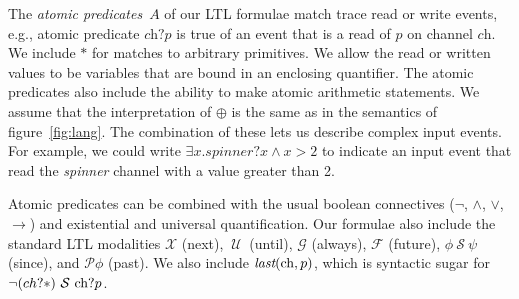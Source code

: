 \documentclass[10pt,conference,compsocconf]{IEEEtran}
\newcommand{\code}[1]{\text{\lstinline!#1!}}
\newcommand{\sch}{\textit{ch}}
\newcommand{\tnext}{\mathcal{X}}
\newcommand{\talways}{\mathcal{G}}
\newcommand{\tfuture}{\mathcal{F}}
\newcommand{\tuntil}{~\mathcal{U}~}
\newcommand{\tsince}{~\mathcal{S}~}
\newcommand{\tpast}{\mathcal{P}}
\newcommand{\tlast}[2]{\textit{last}(#1, #2)}
\begin{document}
The \emph{atomic predicates}~$A$ of our LTL formulae match trace read
or write events, e.g., atomic predicate $\sch?p$ is true of an event that is a
read of $p$ on channel $\sch$. We include $\ast$ for matches to
arbitrary primitives. We allow the read or written values to be
variables that are bound in an enclosing quantifier. The atomic
predicates also include the ability to make atomic arithmetic
statements.  We assume that the interpretation of $\oplus$ is the same
as in the semantics of figure~\ref{fig:lang}.
The combination of these lets us describe complex input
events. For example, we could write
$\exists x. \textit{spinner}?x \wedge x > 2$ to indicate an input
event that read the \emph{spinner} channel with a value greater than
2.

Atomic predicates can be combined with the usual boolean connectives
($\neg$, $\wedge$, $\vee$, $\rightarrow$) and existential and
universal quantification.  Our formulae also include the standard LTL
modalities $\tnext$ (next), $\tuntil$
(until), $\talways$ (always), $\tfuture$ (future), $\phi \tsince \psi$
(since), and $\tpast \phi$ (past).  We also include
$\tlast{\code{ch}}{p}$, which is syntactic sugar for $\lnot (ch?\ast)
\tsince \code{ch}?p$.
\end{document}
